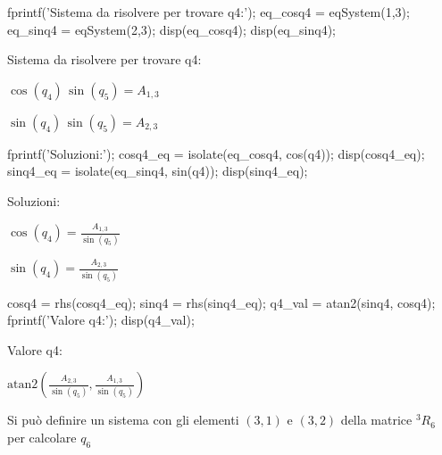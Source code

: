 \documentclass[11pt, a4paper]{article}
\begin{document}
\begin{matlabcode}
fprintf('Sistema da risolvere per trovare q4:');
eq_cosq4 = eqSystem(1,3);
eq_sinq4 = eqSystem(2,3);
disp(eq_cosq4);
disp(eq_sinq4);
\end{matlabcode}

\begin{matlaboutput}
Sistema da risolvere per trovare q4:
\end{matlaboutput}
\begin{matlabsymbolicoutput}
$\displaystyle \cos \left(q_4 \right)\,\sin \left(q_5 \right)=A_{1,3} $
\end{matlabsymbolicoutput}
\begin{matlabsymbolicoutput}
$\displaystyle \sin \left(q_4 \right)\,\sin \left(q_5 \right)=A_{2,3} $
\end{matlabsymbolicoutput}
\begin{matlabcode}
fprintf('Soluzioni:');
cosq4_eq = isolate(eq_cosq4, cos(q4));
disp(cosq4_eq);
sinq4_eq = isolate(eq_sinq4, sin(q4));
disp(sinq4_eq);
\end{matlabcode}
\begin{matlaboutput}
Soluzioni:
\end{matlaboutput}
\begin{matlabsymbolicoutput}
$\displaystyle \cos \left(q_4 \right)=\frac{A_{1,3} }{\sin \left(q_5 \right)}$
\end{matlabsymbolicoutput}
\begin{matlabsymbolicoutput}
$\displaystyle \sin \left(q_4 \right)=\frac{A_{2,3} }{\sin \left(q_5 \right)}$
\end{matlabsymbolicoutput}
\begin{matlabcode}
cosq4 = rhs(cosq4_eq);
sinq4 = rhs(sinq4_eq);
q4_val = atan2(sinq4, cosq4);
fprintf('Valore q4:');
disp(q4_val);
\end{matlabcode}
\begin{matlaboutput}
Valore q4:
\end{matlaboutput}
\begin{matlabsymbolicoutput}
$\displaystyle \textrm{atan2}\left(\frac{A_{2,3} }{\sin \left(q_5 \right)},\frac{A_{1,3} }{\sin \left(q_5 \right)}\right)$
\end{matlabsymbolicoutput}

\begin{flushleft}
    Si può definire un sistema con gli elementi $(3,1)$ e $(3,2)$ della matrice $^3 R_6$ per calcolare $q_6$
\end{flushleft}
\end{document}

